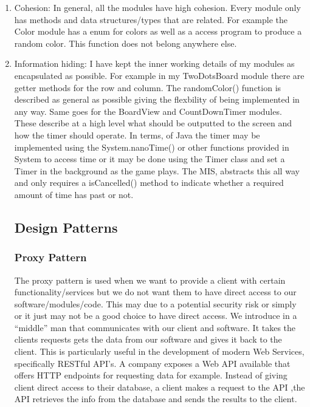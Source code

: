 \documentclass[12pt]{article}
\begin{document}
\begin{enumerate}
\item Cohesion: In general, all the modules have high cohesion. Every module only has methods and data structures/types that are related. For example the Color module has a enum for colors as well as a access program to produce a random color. This function does not belong anywhere else.

\item Information hiding: I have kept the inner working details of my modules as encapsulated as possible. For example in my TwoDotsBoard module there are getter methods for the row and column. The randomColor() function is described as general as possible giving the flexbility of being implemented in any way. Same goes for the BoardView and CountDownTimer modules. These describe at a high level what should be outputted to the screen and how the timer should operate. In terms, of Java the timer may be implemented using the System.nanoTime() or other functions provided in System to access time or it may be done using the Timer class and set a Timer in the background as the game plays. The MIS, abstracts this all way and only requires a isCancelled() method to indicate whether a required amount of time has past or not.


\subsection*{Design Patterns}
\subsubsection*{Proxy Pattern}
\noindent The proxy pattern is used when we want to provide a client with certain functionality/services but we do not want them to have direct access to our software/modules/code. This may due to a potential security risk or simply or it just may not be a good choice to have direct access. We introduce in a ``middle'' man that communicates with our client and software. It takes the clients requests gets the data from our software and gives it back to the client. This is particularly useful in the development of modern Web Services, specifically RESTful API's. A company exposes a Web API available that offers HTTP endpoints for requesting data for example. Instead of giving client direct access to their database, a client makes a request to the API ,the API retrieves the info from the database and sends the results to the client. 

\end{enumerate}
\end{document}
